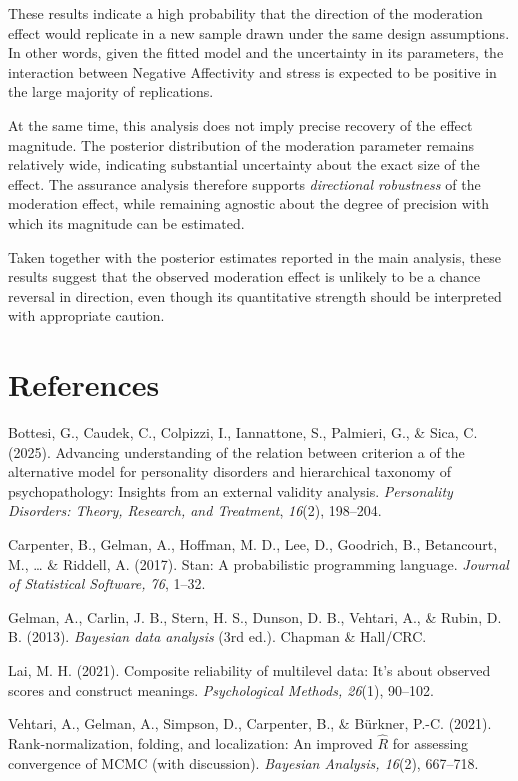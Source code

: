 \documentclass[
  english,
  man,floatsintext]{apa6}
\begin{document}
These results indicate a high probability that the direction of the moderation effect would replicate in a new sample drawn under the same design assumptions. In other words, given the fitted model and the uncertainty in its parameters, the interaction between Negative Affectivity and stress is expected to be positive in the large majority of replications.

At the same time, this analysis does not imply precise recovery of the effect magnitude. The posterior distribution of the moderation parameter remains relatively wide, indicating substantial uncertainty about the exact size of the effect. The assurance analysis therefore supports \emph{directional robustness} of the moderation effect, while remaining agnostic about the degree of precision with which its magnitude can be estimated.

Taken together with the posterior estimates reported in the main analysis, these results suggest that the observed moderation effect is unlikely to be a chance reversal in direction, even though its quantitative strength should be interpreted with appropriate caution.

\newpage

\section{References}\label{references}

Bottesi, G., Caudek, C., Colpizzi, I., Iannattone, S., Palmieri, G., \& Sica, C. (2025). Advancing understanding of the relation between criterion a of the alternative model for personality disorders and hierarchical taxonomy of psychopathology: Insights from an external validity analysis. \emph{Personality Disorders: Theory, Research, and Treatment}, \emph{16}(2), 198--204.

Carpenter, B., Gelman, A., Hoffman, M. D., Lee, D., Goodrich, B., Betancourt, M., \ldots{} \& Riddell, A. (2017). Stan: A probabilistic programming language. \emph{Journal of Statistical Software, 76}, 1--32.

Gelman, A., Carlin, J. B., Stern, H. S., Dunson, D. B., Vehtari, A., \& Rubin, D. B. (2013). \emph{Bayesian data analysis} (3rd ed.). Chapman \& Hall/CRC.

Lai, M. H. (2021). Composite reliability of multilevel data: It's about observed scores and construct meanings. \emph{Psychological Methods, 26}(1), 90--102.

Vehtari, A., Gelman, A., Simpson, D., Carpenter, B., \& Bürkner, P.-C. (2021). Rank-normalization, folding, and localization: An improved \(\hat{R}\) for assessing convergence of MCMC (with discussion). \emph{Bayesian Analysis, 16}(2), 667--718.
\end{document}
